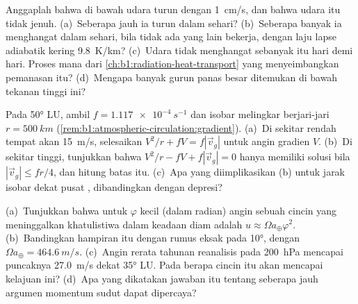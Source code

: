 \begin{exercise}[$\star\star$]\label{exo:b1:atmospheric-circulation:9}
Anggaplah bahwa di bawah  udara turun dengan \qty{1}{cm/s}, dan bahwa udara itu tidak jenuh. (a)~Seberapa jauh ia turun dalam sehari? (b)~Seberapa banyak ia menghangat dalam sehari, bila tidak ada yang lain bekerja, dengan laju lapse adiabatik kering \qty{9.8}{K/km}? (c)~Udara tidak menghangat sebanyak itu hari demi hari. Proses mana dari \cref{ch:b1:radiation-heat-transport} yang menyeimbangkan pemanasan itu? (d)~Mengapa banyak gurun panas besar ditemukan di bawah tekanan tinggi ini?
\end{exercise}

\begin{exercise}[$\star\star\star$]\label{exo:b1:atmospheric-circulation:10}
Pada \ang{50} LU, ambil $f = \qty{1.117e-4}{s^{-1}}$ dan isobar melingkar berjari-jari
$r = \qty{500}{km}$ (\cref{rem:b1:atmospheric-circulation:gradient}). (a)~Di sekitar rendah tempat 
akan \qty{15}{m/s}, selesaikan $V^2/r + fV =
f|\vec v_g|$ untuk angin gradien $V$. (b)~Di sekitar tinggi, tunjukkan bahwa $V^2/r - fV + f
|\vec v_g| = 0$ hanya memiliki solusi bila $|\vec v_g| \leq fr/4$, dan hitung batas itu.
(c)~Apa yang diimplikasikan (b) untuk jarak isobar dekat pusat , dibandingkan dengan depresi?
\end{exercise}

\begin{exercise}[$\star\star\star$]\label{exo:b1:atmospheric-circulation:11}
(a)~Tunjukkan bahwa untuk $\varphi$ kecil (dalam radian) angin sebuah cincin yang meninggalkan
khatulistiwa dalam keadaan diam adalah $u \approx \Omega a_\oplus\varphi^2$. (b)~Bandingkan hampiran itu
dengan rumus eksak pada \ang{10}, dengan $\Omega a_\oplus = \qty{464.6}{m/s}$. (c)~Angin rerata
tahunan reanalisis pada \qty{200}{hPa} mencapai puncaknya \qty{27.0}{m/s} dekat
\ang{35} LU. Pada  berapa cincin itu akan mencapai kelajuan ini? (d)~Apa yang dikatakan
jawaban itu tentang seberapa jauh argumen momentum sudut dapat dipercaya?
\end{exercise}

